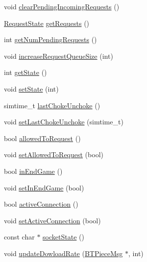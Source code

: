 \begin{DoxyCompactItemize}
\item 
void \hyperlink{classBTPeerWireClientHandlerBase_ae8fde71b4845f5b438ad25941ab1ed32}{clear\+Pending\+Incoming\+Requests} ()
\item 
\hyperlink{classRequestState}{Request\+State} \hyperlink{classBTPeerWireClientHandlerBase_a4a2bdba08d9795abd9cacd490f7f7fa2}{get\+Requests} ()
\item 
int \hyperlink{classBTPeerWireClientHandlerBase_a9d436de27e234b7ea6efe98b89d5dda5}{get\+Num\+Pending\+Requests} ()
\item 
void \hyperlink{classBTPeerWireClientHandlerBase_aafc909e05d47fd83120e446a599a340a}{increase\+Request\+Queue\+Size} (int)
\item 
int \hyperlink{classBTPeerWireClientHandlerBase_ad472fb16748702d6e06bfeb182672c97}{get\+State} ()
\item 
void \hyperlink{classBTPeerWireClientHandlerBase_ac6b9ceaf497a1163468150b8608b3010}{set\+State} (int)
\item 
simtime\+\_\+t \hyperlink{classBTPeerWireClientHandlerBase_a98b88b4b0c373fb76bb8c85ff37ff846}{last\+Choke\+Unchoke} ()
\item 
void \hyperlink{classBTPeerWireClientHandlerBase_aee003ca2d11ee81b58d4855b9be19941}{set\+Last\+Choke\+Unchoke} (simtime\+\_\+t)
\item 
bool \hyperlink{classBTPeerWireClientHandlerBase_a5bd0e7aff2b810be26acf654354ad4f3}{allowed\+To\+Request} ()
\item 
void \hyperlink{classBTPeerWireClientHandlerBase_a76120fc420e710b81ce55313d8c5e6a3}{set\+Allowed\+To\+Request} (bool)
\item 
bool \hyperlink{classBTPeerWireClientHandlerBase_a03541b3c0f171b1c7765d171b1036ee2}{in\+End\+Game} ()
\item 
void \hyperlink{classBTPeerWireClientHandlerBase_a73e9ccd9f9875ef47afe345bf423939c}{set\+In\+End\+Game} (bool)
\item 
bool \hyperlink{classBTPeerWireClientHandlerBase_aed3f62796a8c80716179037931ca5705}{active\+Connection} ()
\item 
void \hyperlink{classBTPeerWireClientHandlerBase_aa8a49edb676980255f080c0692c33ce0}{set\+Active\+Connection} (bool)
\item 
const char $\ast$ \hyperlink{classBTPeerWireClientHandlerBase_a1d74bfc2beb178cec5d9b48c776c9ec5}{socket\+State} ()
\item 
void \hyperlink{classBTPeerWireClientHandlerBase_ad5c1656f8249bb62929224375dba07ff}{update\+Dowload\+Rate} (\hyperlink{classBTPieceMsg}{B\+T\+Piece\+Msg} $\ast$, int)

\end{DoxyCompactItemize}
